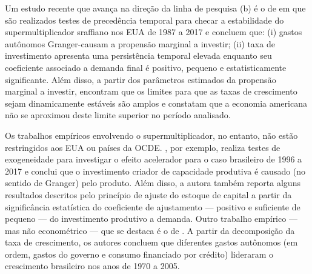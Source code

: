 Um estudo recente que avança na direção da linha de pesquisa (b) é o de \textcite{haluska_growth_2019} em que são realizados testes de precedência temporal para checar a estabilidade do supermultiplicador sraffiano nos EUA de 1987 a 2017 e concluem que: (i) gastos autônomos Granger-causam a propensão marginal a investir; (ii) taxa de investimento apresenta uma persistência temporal elevada enquanto seu coeficiente associado a demanda final é positivo, pequeno e estatisticamente significante. 
Além disso, a partir dos parâmetros estimados da propensão marginal a investir, encontram que os limites para que as taxas de crescimento sejam dinamicamente estáveis são amplos e constatam que a economia americana não se aproximou deste limite superior no período analisado.


Os trabalhos empíricos envolvendo o supermultiplicador, no entanto, não estão restringidos aos EUA ou países da OCDE.  
\textcite{braga_investment_2018}, por exemplo, realiza testes de exogeneidade para investigar o efeito acelerador para o caso brasileiro de 1996 a 2017 e conclui que o investimento criador de capacidade produtiva é causado (no sentido de Granger) pelo produto.
Além disso, a autora também reporta alguns resultados descritos pelo princípio de ajuste do estoque de capital a partir da significância estatística do coeficiente de ajustamento --- positivo e suficiente de pequeno --- do investimento produtivo a demanda.
Outro trabalho empírico --- mas não econométrico --- que se destaca é o de \textcite{freitas_pattern_2013}.
A partir da decomposição da taxa de crescimento, os autores concluem que diferentes gastos autônomos (em ordem, gastos do governo e consumo financiado por crédito) lideraram o crescimento brasileiro nos anos de 1970 a 2005.


